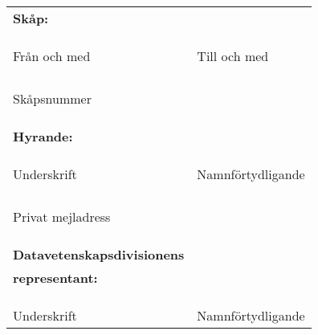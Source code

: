\documentclass{dvd}
\begin{document}
	\newpage
	\begin{tabular}{@{}p{} p{}@{}}
		\textbf{Skåp:}
		\\ \\ \\
	    \hrulefill & \hrulefill\\
	    Från och med & Till och med\\

	    \\ \\ \\
	    \hrulefill &\\
	    Skåpsnummer &\\

	    \\ \\ \\
	    \textbf{Hyrande:}
	    \\ \\ \\
	    \hrulefill & \hrulefill\\
	    Underskrift & Namnförtydligande\\

	    \\ \\ \\
	    \hrulefill & \\
	    Privat mejladress &\\

	    \\ \\ \\
	    \textbf{Datavetenskapsdivisionens}\\
	    \textbf{representant:}
		\\ \\ \\
	    \hrulefill & \hrulefill\\
	    Underskrift & Namnförtydligande\\
	\end{tabular}
\end{document}
